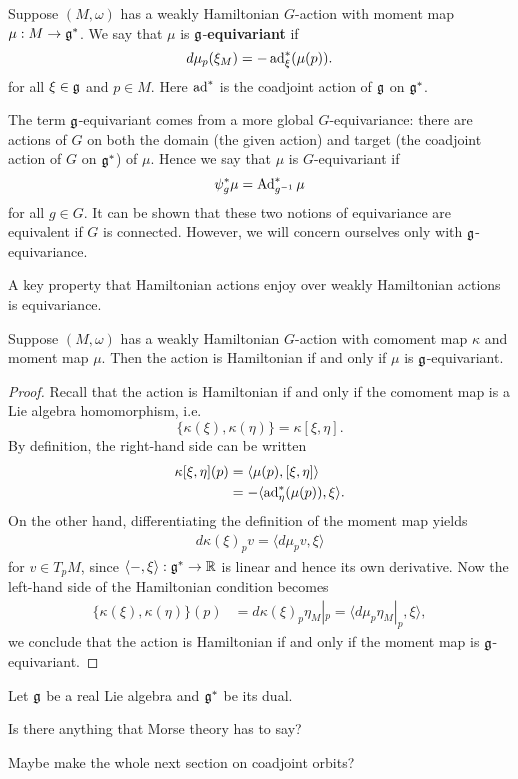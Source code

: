 \documentclass{amsart}
\begin{document}
\begin{definition}
    Suppose $(M,\omega)$ has a weakly Hamiltonian $G$-action with moment map $\mu:M\to\mathfrak g^*$.
    We say that $\mu$ is $\mathfrak g$-\textbf{equivariant} if
    \begin{equation*}
        d\mu_p(\xi_M) = -\operatorname{ad}_\xi^*(\mu(p)).
    \end{equation*}
    for all $\xi\in\mathfrak g$ and $p\in M$. Here $\operatorname{ad}^*$ is the coadjoint action of $\mathfrak g$ on $\mathfrak g^*$.
\end{definition}
\begin{remark}
    The term $\mathfrak g$-equivariant comes from a more global $G$-equivariance: there
    are actions of $G$ on both the domain (the given action) and target
    (the coadjoint action of $G$ on $\mathfrak g^*$) of $\mu$. Hence we say that $\mu$ is $G$-equivariant if
    \begin{equation*}
        \psi_g^*\mu = \operatorname{Ad}^*_{g^{-1}}\mu
    \end{equation*}
    for all $g\in G$. It can be shown that these two notions of equivariance are equivalent if $G$
    is connected. However, we will concern ourselves only with $\mathfrak g$-equivariance.
\end{remark}

A key property that Hamiltonian actions enjoy over weakly Hamiltonian actions is equivariance.
\begin{proposition}
    Suppose $(M,\omega)$ has a weakly Hamiltonian $G$-action with comoment map $\kappa$ and
    moment map $\mu$. Then the action is Hamiltonian if and only if $\mu$ is $\mathfrak g$-equivariant.
\end{proposition}
\begin{proof}
    Recall that the action is Hamiltonian if and only if the comoment map is a Lie algebra
    homomorphism, i.e.
    \begin{equation*}
        \{\kappa(\xi), \kappa(\eta)\} = \kappa[\xi,\eta].
    \end{equation*}
    By definition, the right-hand side can be written
    \begin{align*}
        \kappa[\xi,\eta](p) &= \langle \mu(p), [\xi,\eta]\rangle\\
        &= -\langle \operatorname{ad}_\eta^*(\mu(p)), \xi\rangle.
    \end{align*}
    On the other hand, differentiating the definition of the moment map yields
    \begin{align*}
        d\kappa(\xi)_p v= \langle d\mu_p v, \xi\rangle
    \end{align*}
    for $v\in T_pM$, since $\langle-,\xi\rangle:\mathfrak g^*\to\mathbb{R}$ is linear and hence its own derivative.
    Now the left-hand side of the Hamiltonian condition becomes
    \begin{align*}
        \{\kappa(\xi),\kappa(\eta)\}(p) &= d\kappa(\xi)_p\eta_M|_p = \langle d\mu_p\eta_M|_p, \xi\rangle,
    \end{align*}
    we conclude that the action is Hamiltonian if and only if the moment map is $\mathfrak g$-equivariant.
\end{proof}

\begin{example}
    Let $\mathfrak g$ be a real Lie algebra and $\mathfrak g^*$ be its dual. 
\end{example}

Is there anything that Morse theory has to say?

Maybe make the whole next section on coadjoint orbits?
\end{document}
